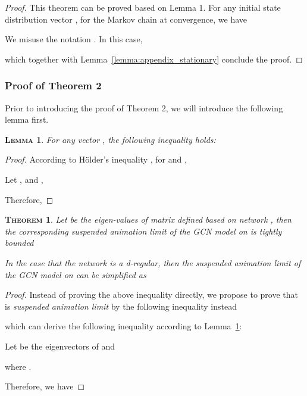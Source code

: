 \documentclass{article}
\newtheorem{appendix_theo}{\textsc{Theorem}}
\newtheorem{appendix_lemma}{\textsc{Lemma}}
\newcommand{\gcn}{\textsc{GCN}}
\begin{document}
\begin{proof}
This theorem can be proved based on Lemma 1. For any initial state distribution vector , for the Markov chain at convergence, we have

We misuse the notation . In this case,
 
which together with Lemma~\ref{lemma:appendix_stationary} conclude the proof.
\end{proof}

\subsubsection{Proof of Theorem 2}

Prior to introducing the proof of Theorem 2, we will introduce the following lemma first.
\begin{appendix_lemma}\label{lemma:help_lemma}
For any vector , the following inequality holds:

\end{appendix_lemma}


\begin{proof}
According to H\"older's inequality \cite{H89}, for  and ,

Let ,  and , 

Therefore,

\end{proof}

\begin{appendix_theo}\label{theo:limit}
Let  be the eigen-values of matrix  defined based on network , then the corresponding \textit{suspended animation limit} of the {\gcn} model on  is tightly bounded

In the case that the network  is a \textit{d-regular}, then the \textit{suspended animation limit} of the {\gcn} model on  can be simplified as

\end{appendix_theo}

\begin{proof}
Instead of proving the above inequality directly, we propose to prove that  is \textit{suspended animation limit} by the following inequality instead

which can derive the following inequality according to Lemma~\ref{lemma:help_lemma}:


Let  be the eigenvectors of  and 

where .

Therefore, we have

\end{proof}
\end{document}
